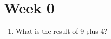 \documentclass[a4paper,12pt]{CURSUS}
\newcommand{\BN}{\begin{enumerate}}
\newcommand{\EN}{\end{enumerate}}
\begin{document}
\addtocounter{chapter}{-1}
\renewcommand{\chaptername}{Assignment}
\chapter{Week 0}

 \BN

 \item

 \begin{center}

 What is the result of 9 plus 4?

 \end{center}

 \EN
\end{document}
